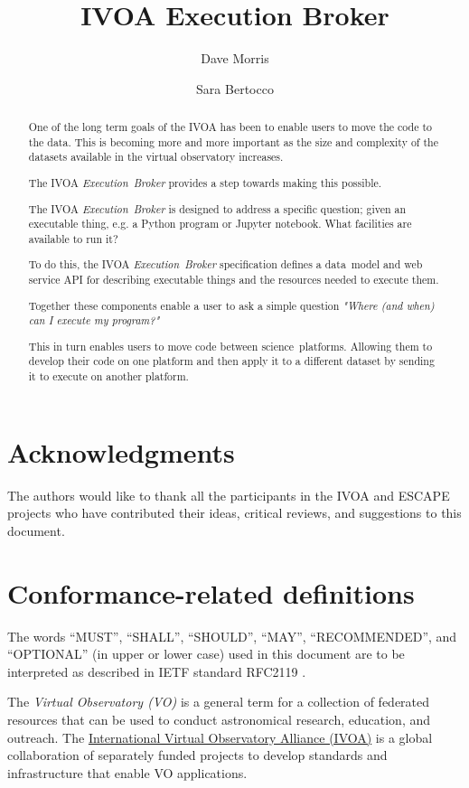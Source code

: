\documentclass[11pt,a4paper]{ivoa}
\title{IVOA Execution Broker}
\author[http://www.ivoa.net/twiki/bin/view/IVOA/DaveMorris]
       {Dave Morris}
\author[http://www.ivoa.net/twiki/bin/view/IVOA/SaraBertocco]
       {Sara Bertocco}
\newcommand{\datamodel} {data~model}
\newcommand{\webservice} {web service}
\newcommand{\ivoa} {IVOA}
\newcommand{\executionbroker} {\textit{Execution~Broker}}
\newcommand{\jupyternotebook} {Jupyter notebook}
\newcommand{\pythonprogram} {Python program}
\newcommand{\footurl}[1] {\footnote{\url{#1}}}
\newcommand{\dataset}[1] {dataset#1}
\newcommand{\scienceplatform}[1] {science~platform#1}
\begin{document}
\begin{abstract}
\label{abstract}

One of the long term goals of the \ivoa{} has been to enable users to
move the code to the data.
This is becoming more and more important as the size and complexity
of the \dataset{s} available in the virtual observatory increases.

The \ivoa{} \executionbroker{} provides a step towards making this possible.

The \ivoa{} \executionbroker{} is designed to address a specific question;
given an executable thing, e.g. a \pythonprogram{} or \jupyternotebook{}.
What facilities are available to run it?

To do this, the \ivoa{} \executionbroker{} specification defines
a \datamodel{} and \webservice{} API for describing executable things
and the resources needed to execute them.

Together these components enable a user to ask a simple question
\textit{"Where (and when) can I execute my program?"}

This in turn enables users to move code between \scienceplatform{s}.
Allowing them to develop their code on one platform and then apply it to a different
\dataset{} by sending it to execute on another platform.

\end{abstract}

\section*{Acknowledgments}
\label{acknowledgments}

The authors would like to thank all the participants in the IVOA and ESCAPE projects
who have contributed their ideas, critical reviews, and suggestions to this document.

\section*{Conformance-related definitions}

The words ``MUST'', ``SHALL'', ``SHOULD'', ``MAY'', ``RECOMMENDED'', and
``OPTIONAL'' (in upper or lower case) used in this document are to be
interpreted as described in IETF standard RFC2119 \citep{std:RFC2119}.

The \emph{Virtual Observatory (VO)} is a general term for a collection of
federated resources that can be used to conduct astronomical research,
education, and outreach.
The \href{https://www.ivoa.net}{International Virtual Observatory Alliance (IVOA)}
is a global collaboration of separately funded projects to develop standards and
infrastructure that enable VO applications.
\end{document}
